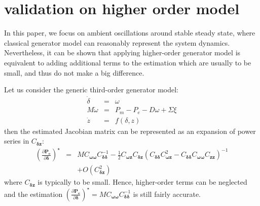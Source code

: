\documentclass[journal]{IEEEtran}
\begin{document}
\section{validation on higher order model}\label{higherordermodel}
In this paper, we focus on ambient oscillations around stable steady state, where classical generator model can reasonably represent the system dynamics. Nevertheless, it can be shown that applying higher-order generator model is equivalent to adding additional terms to the estimation which are usually to be small, and thus do not make a big difference.

Let us consider the generic third-order generator model:
\begin{eqnarray}
\dot{\delta} &=& \omega\\
  M\dot{{\omega}}&=&{P_m}-{P_e}-{D}{\omega}+{\Sigma}{\xi}\\
  \dot{z}&=&f(\delta,z)
\end{eqnarray}
then the estimated Jacobian matrix can be represented as an expansion of power series in $C_{\bm{{\delta}}{\bm{{z}}}}$:
\small{
\begin{eqnarray}
  {(\frac{\partial\bm{P_e}}{\partial\bm{{\delta}}})^\star}&=&MC_{\bm{{\omega}}{\bm{{\omega}}}}C^{-1}_{\bm{{\delta}}{\bm{{\delta}}}}
  -\frac{1}{2}{C_{\bm{{\omega}}{\bm{{z}}}}C_{\bm{{\delta}}{\bm{{z}}}}}{(C_{\bm{{\delta}}{\bm{{\delta}}}}C^2_{\bm{{\omega}}{\bm{{z}}}}-C_{\bm{{\delta}}{\bm{{\delta}}}}C_{\bm{{\omega}}{\bm{{\omega}}}}C_{\bm{{z}}{\bm{{z}}}})}^{-1}\nonumber\\
  &&+O(C^2_{\bm{{\delta}}{\bm{{z}}}})
\end{eqnarray}
}
\normalsize
where $C_{\bm{{\delta}}{\bm{{z}}}}$ is typically to be small. Hence, higher-order terms can be neglected and the estimation ${(\frac{\partial\bm{P_e}}{\partial\bm{{\delta}}})^\star}=MC_{\bm{{\omega}}{\bm{{\omega}}}}C^{-1}_{\bm{{\delta}}{\bm{{\delta}}}}$ is still fairly accurate.
\end{document}
